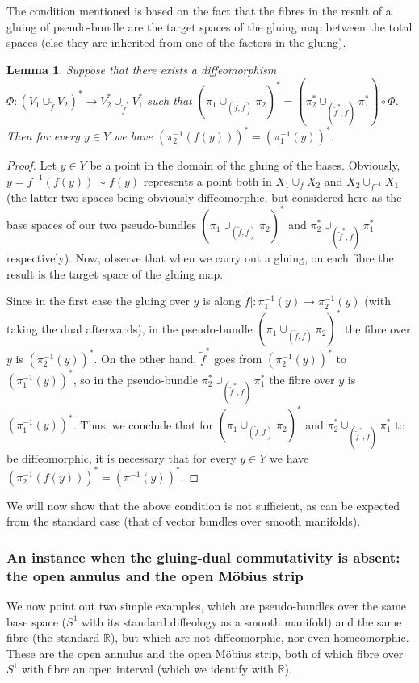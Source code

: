 \documentclass{article}
\newtheorem{lemma}{Lemma}[section]
\newcommand\matR{{\mathbb{R}}}
\begin{document}
The condition mentioned is based on the fact that the fibres in the result of a gluing of pseudo-bundle are the target spaces of the gluing map between the total spaces (else they are inherited from one of 
the factors in the gluing).

\begin{lemma}
Suppose that there exists a diffeomorphism $\Phi:(V_1\cup_{\tilde{f}}V_2)^*\to V_2^*\cup_{\tilde{f}^*}V_1^*$ such that $(\pi_1\cup_{(\tilde{f},f)}\pi_2)^*=\left(\pi_2^*\cup_{(\tilde{f}^*,f)}\pi_1^*\right)\circ\Phi$.
Then for every $y\in Y$ we have $(\pi_2^{-1}(f(y)))^*=(\pi_1^{-1}(y))^*$.
\end{lemma}

\begin{proof}
Let $y\in Y$ be a point in the domain of the gluing of the bases. Obviously, $y=f^{-1}(f(y))\sim f(y)$ represents a point both in $X_1\cup_f X_2$ and $X_2\cup_{f^{-1}}X_1$ (the latter two spaces being obviously 
diffeomorphic, but considered here as the base spaces of our two pseudo-bundles $(\pi_1\cup_{(\tilde{f},f)}\pi_2)^*$ and $\pi_2^*\cup_{(\tilde{f}^*,f)}\pi_1^*$ respectively). Now, observe that when we carry 
out a gluing, on each fibre the result is the target space of the gluing map.

Since in the first case the gluing over $y$ is along $\tilde{f}|:\pi_1^{-1}(y)\to\pi_2^{-1}(y)$ (with taking the dual afterwards), in the pseudo-bundle $(\pi_1\cup_{(\tilde{f},f)}\pi_2)^*$ the fibre over $y$ is
$(\pi_2^{-1}(y))^*$. On the other hand, $\tilde{f}^*$ goes from $(\pi_2^{-1}(y))^*$ to $(\pi_1^{-1}(y))^*$, so in the pseudo-bundle $\pi_2^*\cup_{(\tilde{f}^*,f)}\pi_1^*$ the fibre over $y$ is $(\pi_1^{-1}(y))^*$. Thus, 
we conclude that for $(\pi_1\cup_{(\tilde{f},f)}\pi_2)^*$ and $\pi_2^*\cup_{(\tilde{f}^*,f)}\pi_1^*$ to be diffeomorphic, it is necessary that for every $y\in Y$ we have $(\pi_2^{-1}(f(y)))^*=(\pi_1^{-1}(y))^*$.
\end{proof}

We will now show that the above condition is not sufficient, as can be expected from the standard case (that of vector bundles over smooth manifolds).


\subsubsection{An instance when the gluing-dual commutativity is absent: the open annulus and the open M\"obius strip} 

We now point out two simple examples, which are pseudo-bundles over the same base space ($S^1$ with its standard diffeology as a smooth manifold) and the same fibre (the standard $\matR$), but which 
are not diffeomorphic, nor even homeomorphic. These are the open annulus and the open M\"obius strip, both of which fibre over $S^1$ with fibre an open interval (which we identify with $\matR$).
\end{document}
